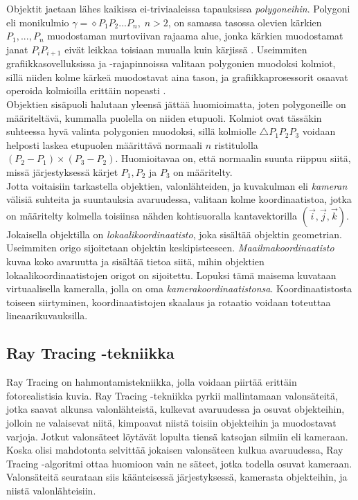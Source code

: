 \documentclass[a4paper,12pt, titlepage]{article}
\begin{document}
Objektit jaetaan lähes kaikissa ei-triviaaleissa tapauksissa \emph{polygoneihin}. Polygoni eli monikulmio $\gamma = \diamond P_1P_2...P_n, \; n > 2$, on samassa tasossa olevien kärkien $P_1,...,P_n$ muodostaman murtoviivan rajaama alue, jonka kärkien muodostamat janat $P_i P_{i+1}$ eivät leikkaa toisiaan muualla kuin kärjissä \citep{harju}. Useimmiten grafiikkasovelluksissa ja -rajapinnoissa valitaan polygonien muodoksi kolmiot, sillä niiden kolme kärkeä muodostavat aina tason, ja grafiikkaprosessorit osaavat operoida kolmioilla erittäin nopeasti \citep{angel}.\\

Objektien sisäpuoli halutaan yleensä jättää huomioimatta, joten polygoneille on määriteltävä, kummalla puolella on niiden etupuoli. Kolmiot ovat tässäkin suhteessa hyvä valinta polygonien muodoksi, sillä kolmiolle $\triangle P_1P_2P_3$ voidaan helposti laskea etupuolen määrittävä normaali $n$ ristitulolla $(P_2-P_1) \times (P_3-P_2)$. Huomioitavaa on, että normaalin suunta riippuu siitä, missä järjestyksessä kärjet $P_1, P_2$ ja $P_3$ on määritelty. \citep[.]{hughes}\\

Jotta voitaisiin tarkastella objektien, valonlähteiden, ja kuvakulman eli \emph{kameran} välisiä suhteita ja suuntauksia avaruudessa, valitaan kolme koordinaatistoa, jotka on määritelty kolmella toisiinsa nähden kohtisuoralla kantavektorilla $(\vec{i},\vec{j},\vec{k})$. Jokaisella objektilla on \emph{lokaalikoordinaatisto}, joka sisältää objektin geometrian. Useimmiten origo sijoitetaan objektin keskipisteeseen. \emph{Maailmakoordinaatisto} kuvaa koko avaruutta ja sisältää tietoa siitä, mihin objektien lokaalikoordinaatistojen origot on sijoitettu. Lopuksi tämä maisema kuvataan virtuaalisella kameralla, jolla on oma \emph{kamerakoordinaatistonsa}. Koordinaatistosta toiseen siirtyminen, koordinaatistojen skaalaus ja rotaatio voidaan toteuttaa lineaarikuvauksilla. \citep[.]{janke}

\subsection{Ray Tracing -tekniikka}

Ray Tracing on hahmontamistekniikka, jolla voidaan piirtää erittäin fotorealistisia kuvia. Ray Tracing -tekniikka pyrkii mallintamaan valonsäteitä, jotka saavat alkunsa valonlähteistä, kulkevat avaruudessa ja osuvat objekteihin, jolloin ne valaisevat niitä, kimpoavat niistä toisiin objekteihin ja muodostavat varjoja. Jotkut valonsäteet löytävät lopulta tiensä katsojan silmiin eli kameraan. Koska olisi mahdotonta selvittää jokaisen valonsäteen kulkua avaruudessa, Ray Tracing -algoritmi ottaa huomioon vain ne säteet, jotka todella osuvat kameraan. Valonsäteitä seurataan siis käänteisessä järjestyksessä, kamerasta objekteihin, ja niistä valonlähteisiin. \citep[.]{janke}\\
\end{document}
